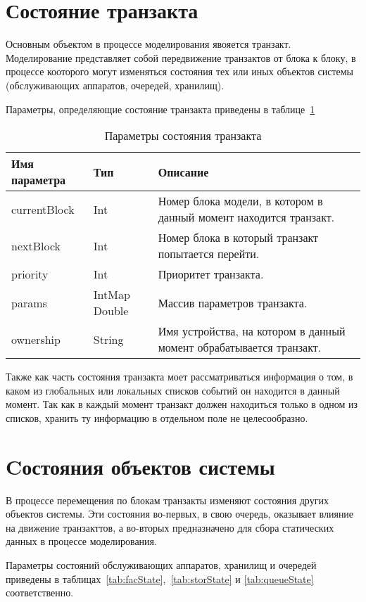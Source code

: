 \section{Состояние транзакта}

Основным объектом в процессе моделирования явояется транзакт. Моделирование представляет собой передвижение транзактов от блока к блоку, в процессе кооторого могут изменяться состояния тех или иных объектов системы (обслуживающих аппаратов, очередей, хранилищ).

Параметры, определяющие состояние транзакта приведены в таблице~\ref{tab:transactionState}

\begin{table}
\caption{Параметры состояния транзакта}
\label{tab:transactionState}
\begin{tabular}{|l|l|p{}|}
\hline
Имя параметра & Тип &Описание \\
\hline
currentBlock & Int & Номер блока модели, в котором в данный момент находится транзакт.\\
\hline
nextBlock & Int & Номер блока в который транзакт попытается перейти.\\
\hline
priority & Int & Приоритет транзакта.\\
\hline
params & IntMap Double & Массив параметров транзакта.\\
\hline
ownership & String & Имя устройства, на котором в данный момент обрабатывается транзакт.\\
\hline
\end{tabular}
\end{table}

Также как часть состояния транзакта моет рассматриваться информация о том, в каком из глобальных или локальных списков событий он находится в данный момент. Так как в каждый момент транзакт должен находиться только в одном из списков, хранить ту информацию в отдельном поле не целесообразно.

\section{Cостояния объектов системы}

В процессе перемещения по блокам транзакты изменяют состояния других объектов системы. Эти состояния во-первых, в свою очередь, оказывает влияние на движение транзакттов, а во-вторых предназначено для сбора статических данных в процессе моделирования.

Параметры состояний обслуживающих аппаратов, хранилищ и очередей приведены в таблицах~\ref{tab:facState},~\ref{tab:storState} и \ref{tab:queueState} соответственно.

